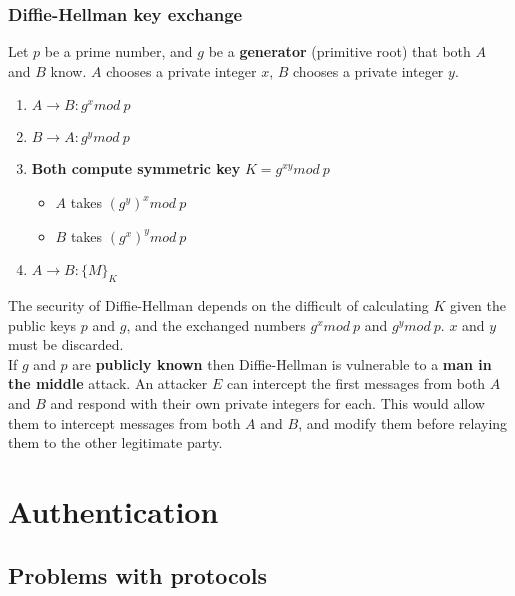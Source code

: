 \documentclass{article}
\newcommand{\np}{\vspace{8pt} \\}
\begin{document}
\subsubsection{Diffie-Hellman key exchange}
Let $ p $ be a prime number, and $ g $ be a \textbf{generator} (primitive root) that both $ A $ and $ B $ know. $ A $ chooses a private integer $ x $, $ B $ chooses a private integer $ y $.
\begin{enumerate}
	\item $ A \rightarrow B : g^{x} mod\ p $
	\item $ B \rightarrow A : g^{y} mod\ p $
	\item \textbf{Both compute symmetric key} $ K = g^{xy} mod\ p $
	\begin{itemize}
		\item $ A $ takes $ \left( g^{y} \right)^{x} mod\ p $
		\item $ B $ takes $ \left( g^{x} \right)^{y} mod\ p $
	\end{itemize}
	\item $ A \rightarrow B : \{ M \}_{K} $
\end{enumerate}
The security of Diffie-Hellman depends on the difficult of calculating $ K $ given the public keys $ p $ and $ g $, and the exchanged numbers $ g^{x} mod\ p $ and $ g^{y} mod\ p $. $ x $ and $ y $ must be discarded. \np
If $ g $ and $ p $ are \textbf{publicly known} then Diffie-Hellman is vulnerable to a \textbf{man in the middle} attack. An attacker $ E $ can intercept the first messages from both $ A $ and $ B $ and respond with their own private integers for each. This would allow them to intercept messages from both $ A $ and $ B $, and modify them before relaying them to the other legitimate party.

\section{Authentication}

\subsection{Problems with protocols}
\end{document}
